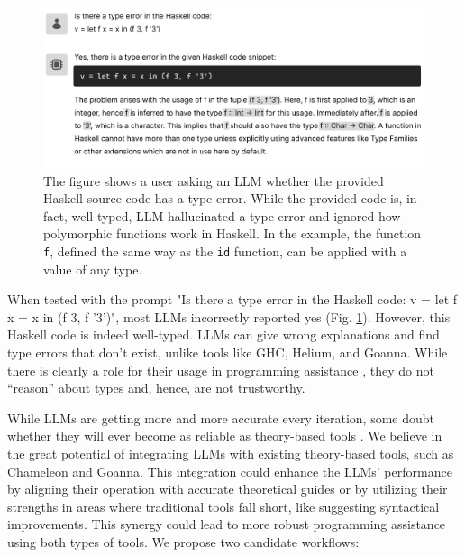 \begin{figure}[hbt]
  \includegraphics[width=\linewidth]{LLM2}
  \caption[An example where LLM identified a type error in well-typed source code]{\label{fig:llm2}
  The figure shows a user asking an LLM whether the provided Haskell source code has a type error. While the provided code is, in fact, well-typed, LLM hallucinated a type error and ignored how polymorphic functions work in Haskell. In the example, the function \texttt{f},  defined the same way as the \texttt{id} function, can be applied with a value of any type.
    } 
\end{figure}

When tested with the prompt "Is there a type error in the Haskell code: v = let f x = x in (f 3, f '3')", most LLMs incorrectly reported yes (Fig. \ref{fig:llm2}). However, this Haskell code is indeed well-typed. LLMs can give wrong explanations and find type errors that don't exist, unlike tools like GHC, Helium, and Goanna. While there is clearly a role for their usage in programming assistance \cite{Lee2024-hs}, they do not “reason” about types and, hence, are not trustworthy.

While LLMs are getting more and more accurate every iteration, some doubt whether they will ever become as reliable as theory-based tools \cite{Berglund2023-ig}. We believe in the great potential of integrating LLMs with existing theory-based tools, such as Chameleon and Goanna. This integration could enhance the LLMs' performance by aligning their operation with accurate theoretical guides or by utilizing their strengths in areas where traditional tools fall short, like suggesting syntactical improvements. This synergy could lead to more robust programming assistance using both types of tools. We propose two candidate workflows:


